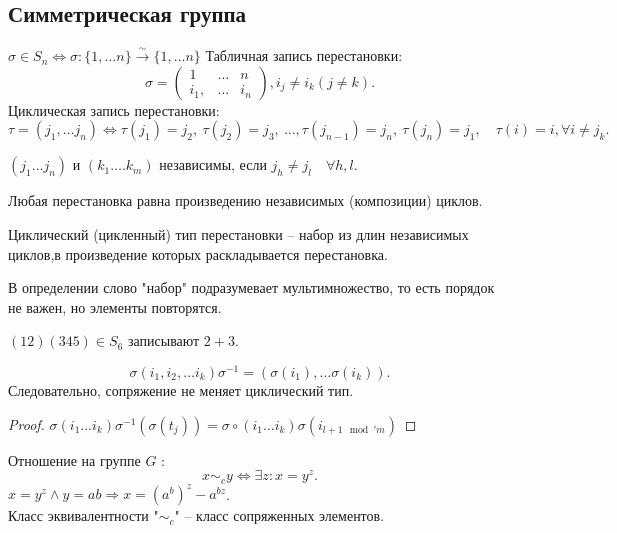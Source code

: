 \documentclass[12pt]{report}
\begin{document}
\subsection{Симметрическая группа}
\begin{defn}[Перестановка]
    $\sigma \in  S_n \Longleftrightarrow \sigma : \{1, \ldots n \} \stackrel{\sim} \to  \{1, \ldots n\}$
    Табличная запись перестановки:
    \[
    \sigma  = \left ( 
    \begin{array}{ccc}
	1 &\ldots& n \\
	i_1, & \ldots  & i_n 
    \end{array}
\right ), i_j \ne i_k (j \ne k)
    .\] 
    Циклическая запись перестановки:
    \[
	\tau = (j_1, \ldots j_n) \Longleftrightarrow 
	\tau(j_1) = j_2, ~ \tau(j_2) = j_3, ~ \ldots , \tau(j_{n-1}) = j_n, ~ \tau(j_n) = j_1, \quad \tau(i) = i, \forall i \ne j_k
    .\] 
\end{defn}
\begin{defn}
    $(j_1 \ldots j_n)$ и $(k_1 \ldots .k_m)$ независимы, если $j_h \ne j_l \quad \forall h, l$.
\end{defn}
\begin{lm}
    Любая перестановка равна произведению независимых (композиции) циклов.
\end{lm}
\begin{defn}
    Циклический (цикленный) тип перестановки -- набор из длин независимых циклов,в произведение которых раскладывается перестановка.
\end{defn}
\begin{note}
    В определении слово "набор" подразумевает мультимножество, то есть порядок не важен, но элементы повторятся.
\end{note}
\begin{ex}
    $(12) (345) \in  S_6$ записывают $2 + 3$.
\end{ex}
\begin{lm}\label{lm_sim_group_1}
    \[
	\sigma (i_1, i_2, \ldots i_k) \sigma ^{-1} = ( \sigma (i_1), \ldots \sigma (i_k))
    .\] 
    Следовательно, сопряжение не меняет циклический тип.
\end{lm}
\begin{proof}
    $\sigma (i_1 \ldots i_k) \sigma ^{-1} (\sigma (t_j))=  \sigma \circ (i_1 \ldots i_k) \sigma  (i_{l+1 \mod' m})$
\end{proof}
\begin{defn}
    Отношение на группе $G$ :
    \[
    x \sim_c y \Leftrightarrow \exists z: x = y^z
    .\] 
    $x=y^z \wedge y=ab \Rightarrow x = (a^b)^z - a^{bz}$.\\
    Класс эквивалентности "$\sim _c$" -- класс сопряженных элементов.
\end{defn}
\end{document}

